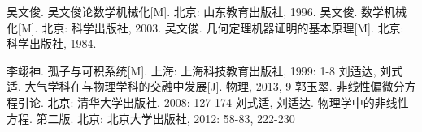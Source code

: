 \cleardoublepage
{}
{}
\nocite{*}
%

\begin{thebibliography}{0}
 吴文俊. 吴文俊论数学机械化[M]. 北京: 山东教育出版社, 1996.
 吴文俊. 数学机械化[M]. 北京: 科学出版社, 2003.
 吴文俊. 几何定理机器证明的基本原理[M]. 北京: 科学出版社, 1984.




 李翊神. 孤子与可积系统[M]. 上海: 上海科技教育出版社, 1999: 1-8
 刘适达, 刘式适. 大气学科在与物理学科的交融中发展[J]. 物理, 2013, 9
 郭玉翠. 非线性偏微分方程引论. 北京: 清华大学出版社, 2008: 127-174
 刘式适, 刘适达. 物理学中的非线性方程. 第二版. 北京: 北京大学出版社, 2012: 58-83, 222-230


\end{thebibliography}
